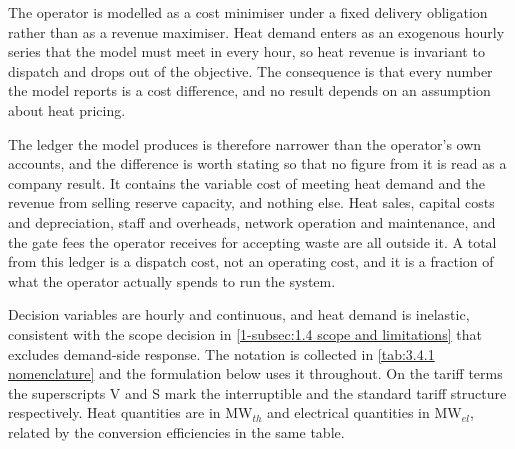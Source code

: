 The operator is modelled as a cost minimiser under a fixed delivery obligation rather than as a revenue maximiser. Heat demand enters as an exogenous hourly series that the model must meet in every hour, so heat revenue is invariant to dispatch and drops out of the objective. The consequence is that every number the model reports is a cost difference, and no result depends on an assumption about heat pricing.

The ledger the model produces is therefore narrower than the operator's own accounts, and the difference is worth stating so that no figure from it is read as a company result. It contains the variable cost of meeting heat demand and the revenue from selling reserve capacity, and nothing else. Heat sales, capital costs and depreciation, staff and overheads, network operation and maintenance, and the gate fees the operator receives for accepting waste are all outside it. A total from this ledger is a dispatch cost, not an operating cost, and it is a fraction of what the operator actually spends to run the system.

Decision variables are hourly and continuous, and heat demand is inelastic, consistent with the scope decision in \autoref{1-subsec:1.4 scope and limitations} that excludes demand-side response. The notation is collected in \autoref{tab:3.4.1 nomenclature} and the formulation below uses it throughout. On the tariff terms the superscripts V and S mark the interruptible and the standard tariff structure respectively. Heat quantities are in MW$_{th}$ and electrical quantities in MW$_{el}$, related by the conversion efficiencies in the same table.


